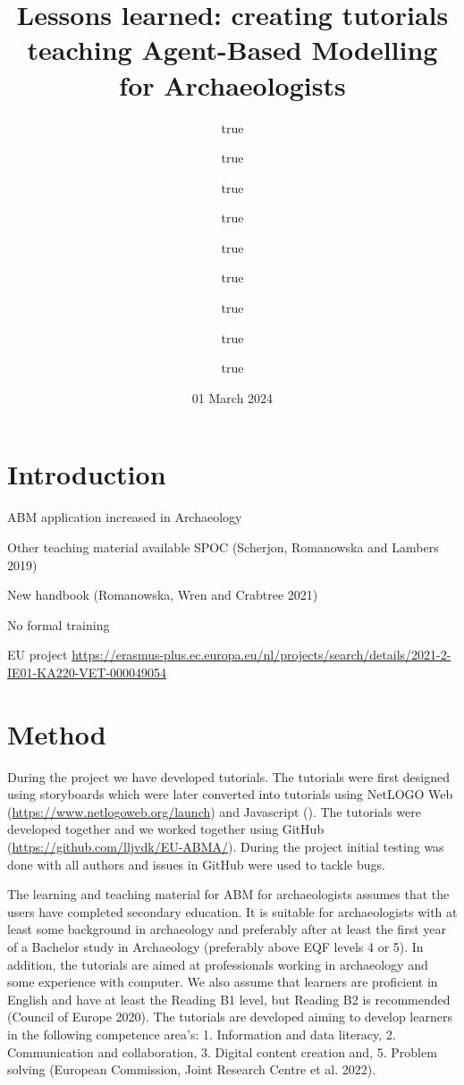 \documentclass[
]{article}
\title{Lessons learned: creating tutorials teaching Agent-Based Modelling for Archaeologists}
\author{true \and true \and true \and true \and true \and true \and true \and true \and true}
\date{01 March 2024}
\begin{document}
\maketitle

{
\setcounter{tocdepth}{2}
\tableofcontents
}
\hypertarget{introduction}{%
\section{Introduction}\label{introduction}}

ABM application increased in Archaeology

Other teaching material available SPOC (Scherjon, Romanowska and Lambers 2019)

New handbook (Romanowska, Wren and Crabtree 2021)

No formal training

EU project \url{https://erasmus-plus.ec.europa.eu/nl/projects/search/details/2021-2-IE01-KA220-VET-000049054}

\hypertarget{method}{%
\section{Method}\label{method}}

During the project we have developed tutorials. The tutorials were first designed using storyboards which were later converted into tutorials using NetLOGO Web (\url{https://www.netlogoweb.org/launch}) and Javascript (). The tutorials were developed together and we worked together using GitHub (\url{https://github.com/lljvdk/EU-ABMA/}). During the project initial testing was done with all authors and issues in GitHub were used to tackle bugs.

The learning and teaching material for ABM for archaeologists assumes that the users have completed secondary education. It is suitable for archaeologists with at least some background in archaeology and preferably after at least the first year of a Bachelor study in Archaeology (preferably above EQF levels 4 or 5). In addition, the tutorials are aimed at professionals working in archaeology and some experience with computer. We also assume that learners are proficient in English and have at least the Reading B1 level, but Reading B2 is recommended (Council of Europe 2020). The tutorials are developed aiming to develop learners in the following competence area's: 1. Information and data literacy, 2. Communication and collaboration, 3. Digital content creation and, 5. Problem solving (European Commission, Joint Research Centre et al. 2022).
\end{document}
